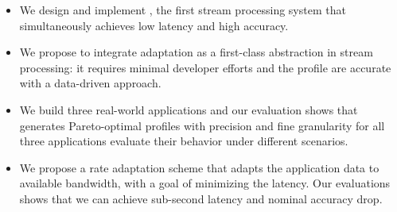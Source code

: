 \begin{itemize}[leftmargin=16pt]
\item We design and implement \sysname{}, the first stream processing system
  that simultaneously achieves low latency and high accuracy.
\item We propose to integrate adaptation as a first-class abstraction in stream
  processing: it requires minimal developer efforts and the profile are accurate
  with a data-driven approach.
\item We build three real-world applications and our evaluation shows that
  \sysname{} generates Pareto-optimal profiles with precision and fine
  granularity for all three applications evaluate their behavior under different
  scenarios.
\item We propose a rate adaptation scheme that adapts the application data to
  available bandwidth, with a goal of minimizing the latency. Our evaluations
  shows that we can achieve sub-second latency and nominal accuracy drop.
\end{itemize}


